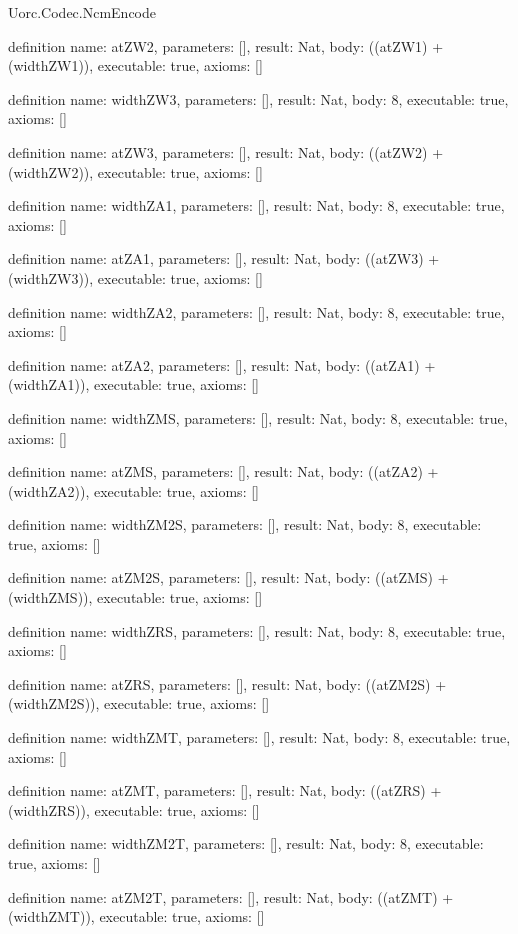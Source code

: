 \begin{lexlean}{Uorc.Codec.NcmEncode}
\begin{semanticmodule}
definition{
  name: atZW2,
  parameters: [],
  result: Nat,
  body: ((atZW1) + (widthZW1)),
  executable: true,
  axioms: []
}

definition{
  name: widthZW3,
  parameters: [],
  result: Nat,
  body: 8,
  executable: true,
  axioms: []
}

definition{
  name: atZW3,
  parameters: [],
  result: Nat,
  body: ((atZW2) + (widthZW2)),
  executable: true,
  axioms: []
}

definition{
  name: widthZA1,
  parameters: [],
  result: Nat,
  body: 8,
  executable: true,
  axioms: []
}

definition{
  name: atZA1,
  parameters: [],
  result: Nat,
  body: ((atZW3) + (widthZW3)),
  executable: true,
  axioms: []
}

definition{
  name: widthZA2,
  parameters: [],
  result: Nat,
  body: 8,
  executable: true,
  axioms: []
}

definition{
  name: atZA2,
  parameters: [],
  result: Nat,
  body: ((atZA1) + (widthZA1)),
  executable: true,
  axioms: []
}

definition{
  name: widthZMS,
  parameters: [],
  result: Nat,
  body: 8,
  executable: true,
  axioms: []
}

definition{
  name: atZMS,
  parameters: [],
  result: Nat,
  body: ((atZA2) + (widthZA2)),
  executable: true,
  axioms: []
}

definition{
  name: widthZM2S,
  parameters: [],
  result: Nat,
  body: 8,
  executable: true,
  axioms: []
}

definition{
  name: atZM2S,
  parameters: [],
  result: Nat,
  body: ((atZMS) + (widthZMS)),
  executable: true,
  axioms: []
}

definition{
  name: widthZRS,
  parameters: [],
  result: Nat,
  body: 8,
  executable: true,
  axioms: []
}

definition{
  name: atZRS,
  parameters: [],
  result: Nat,
  body: ((atZM2S) + (widthZM2S)),
  executable: true,
  axioms: []
}

definition{
  name: widthZMT,
  parameters: [],
  result: Nat,
  body: 8,
  executable: true,
  axioms: []
}

definition{
  name: atZMT,
  parameters: [],
  result: Nat,
  body: ((atZRS) + (widthZRS)),
  executable: true,
  axioms: []
}

definition{
  name: widthZM2T,
  parameters: [],
  result: Nat,
  body: 8,
  executable: true,
  axioms: []
}

definition{
  name: atZM2T,
  parameters: [],
  result: Nat,
  body: ((atZMT) + (widthZMT)),
  executable: true,
  axioms: []
}


\end{semanticmodule}
\end{lexlean}
